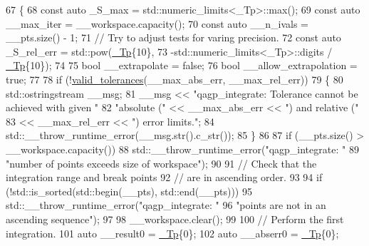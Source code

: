 \begin{DoxyCode}
67     \{
68       \textcolor{keyword}{const} \textcolor{keyword}{auto} \_S\_max = std::numeric\_limits<\_Tp>::max();
69       \textcolor{keyword}{const} \textcolor{keyword}{auto} \_\_max\_iter = \_\_workspace.capacity();
70       \textcolor{keyword}{const} \textcolor{keyword}{auto} \_\_n\_ivals = \_\_pts.size() - 1;
71       \textcolor{comment}{// Try to adjust tests for varing precision.}
72       \textcolor{keyword}{const} \textcolor{keyword}{auto} \_S\_rel\_err = std::pow(\hyperlink{namespace____gnu__cxx_a3b19a9c800ca194374ef9172290f7d79}{\_Tp}\{10\},
73                                  -std::numeric\_limits<\_Tp>::digits / \hyperlink{namespace____gnu__cxx_a3b19a9c800ca194374ef9172290f7d79}{\_Tp}\{10\});
74 
75       \textcolor{keywordtype}{bool} \_\_extrapolate = \textcolor{keyword}{false};
76       \textcolor{keywordtype}{bool} \_\_allow\_extrapolation = \textcolor{keyword}{true};
77 
78       \textcolor{keywordflow}{if} (!\hyperlink{namespace____gnu__cxx_a86b1d89b2e2cb97614fdf3425d3dccd5}{valid\_tolerances}(\_\_max\_abs\_err, \_\_max\_rel\_err))
79         \{
80           std::ostringstream \_\_msg;
81           \_\_msg << \textcolor{stringliteral}{"qagp\_integrate: Tolerance cannot be achieved with given "}
82                    \textcolor{stringliteral}{"absolute ("} << \_\_max\_abs\_err << \textcolor{stringliteral}{") and relative ("}
83                 << \_\_max\_rel\_err << \textcolor{stringliteral}{") error limits."};
84           std::\_\_throw\_runtime\_error(\_\_msg.str().c\_str());
85         \}
86 
87       \textcolor{keywordflow}{if} (\_\_pts.size() > \_\_workspace.capacity())
88         std::\_\_throw\_runtime\_error(\textcolor{stringliteral}{"qagp\_integrate: "}
89                                  \textcolor{stringliteral}{"number of points exceeds size of workspace"});
90 
91       \textcolor{comment}{// Check that the integration range and break points}
92       \textcolor{comment}{// are in ascending order.}
93 
94       \textcolor{keywordflow}{if} (!std::is\_sorted(std::begin(\_\_pts), std::end(\_\_pts)))
95         std::\_\_throw\_runtime\_error(\textcolor{stringliteral}{"qagp\_integrate: "}
96                                    \textcolor{stringliteral}{"points are not in an ascending sequence"});
97 
98       \_\_workspace.clear();
99 
100       \textcolor{comment}{// Perform the first integration.}
101       \textcolor{keyword}{auto} \_\_result0 = \hyperlink{namespace____gnu__cxx_a3b19a9c800ca194374ef9172290f7d79}{\_Tp}\{0\};
102       \textcolor{keyword}{auto} \_\_abserr0 = \hyperlink{namespace____gnu__cxx_a3b19a9c800ca194374ef9172290f7d79}{\_Tp}\{0\};

\end{DoxyCode}
